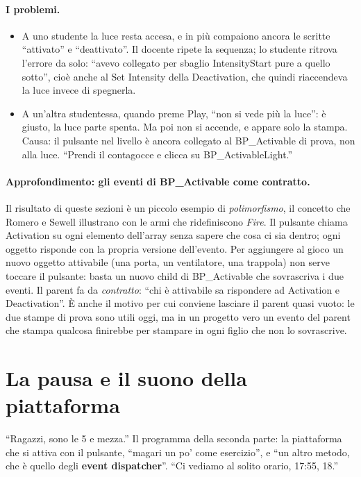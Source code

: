 \paragraph{I problemi.}
\begin{itemize}
  \item A uno studente la luce resta accesa, e in più compaiono ancora le scritte
        ``attivato'' e ``deattivato''. Il docente ripete la sequenza; lo studente ritrova
        l'errore da solo: ``avevo collegato per sbaglio IntensityStart pure a quello
        sotto'', cioè anche al Set Intensity della Deactivation, che quindi riaccendeva la
        luce invece di spegnerla.
  \item A un'altra studentessa, quando preme Play, ``non si vede più la luce'': è
        giusto, la luce parte spenta. Ma poi non si accende, e appare solo la stampa.
        Causa: il pulsante nel livello è ancora collegato al BP\_Activable di prova, non
        alla luce. ``Prendi il contagocce e clicca su BP\_ActivableLight.''
\end{itemize}

\paragraph{Approfondimento: gli eventi di BP\_Activable come contratto.} Il risultato di
queste sezioni è un piccolo esempio di \emph{polimorfismo}, il concetto che Romero e
Sewell illustrano con le armi che ridefiniscono \emph{Fire}. Il pulsante chiama
Activation su ogni elemento dell'array senza sapere che cosa ci sia dentro; ogni oggetto
risponde con la propria versione dell'evento. Per aggiungere al gioco un nuovo oggetto
attivabile (una porta, un ventilatore, una trappola) non serve toccare il pulsante:
basta un nuovo child di BP\_Activable che sovrascriva i due eventi. Il parent fa da
\emph{contratto}: ``chi è attivabile sa rispondere ad Activation e Deactivation''. È anche
il motivo per cui conviene lasciare il parent quasi vuoto: le due stampe di prova sono
utili oggi, ma in un progetto vero un evento del parent che stampa qualcosa finirebbe
per stampare in ogni figlio che non lo sovrascrive.

\section{La pausa e il suono della piattaforma}
\label{ue7:sec:pausa}

``Ragazzi, sono le 5 e mezza.'' Il programma della seconda parte: la piattaforma che si
attiva con il pulsante, ``magari un po' come esercizio'', e ``un altro metodo, che è
quello degli \textbf{event dispatcher}''. ``Ci vediamo al solito orario, 17:55, 18.''

